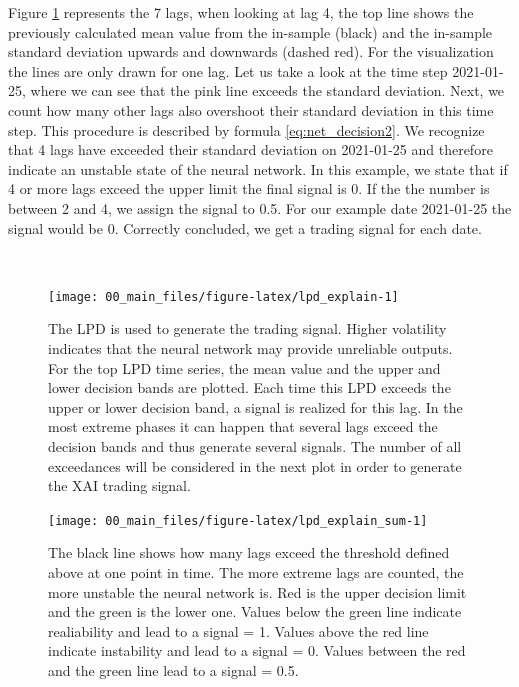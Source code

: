 \documentclass[
]{article}
\begin{document}
Figure \ref{fig:lpd_explain} represents the 7 lags, when looking at lag
4, the top line shows the previously calculated mean value from the
in-sample (black) and the in-sample standard deviation upwards and
downwards (dashed red). For the visualization the lines are only drawn
for one lag. Let us take a look at the time step 2021-01-25, where we
can see that the pink line exceeds the standard deviation. Next, we
count how many other lags also overshoot their standard deviation in
this time step. This procedure is described by formula
\ref{eq:net_decision2}. We recognize that 4 lags have exceeded their
standard deviation on 2021-01-25 and therefore indicate an unstable
state of the neural network. In this example, we state that if 4 or more
lags exceed the upper limit the final signal is 0. If the the number is
between 2 and 4, we assign the signal to 0.5. For our example date
2021-01-25 the signal would be 0. Correctly concluded, we get a trading
signal for each date.

~

\begin{figure}

{\centering \texttt{[image: 00\_main\_files/figure-latex/lpd\_explain-1]} 

}

\caption{The LPD is used to generate the trading signal. Higher volatility indicates that the neural network may provide unreliable outputs. For the top LPD time series, the mean value and the upper and lower decision bands are plotted. Each time this LPD exceeds the upper or lower decision band, a signal is realized for this lag. In the most extreme phases it can happen that several lags exceed the decision bands and thus generate several signals. The number of all exceedances will be considered in the next plot in order to generate the XAI trading signal.}\label{fig:lpd_explain}
\end{figure}

\newpage

\begin{figure}

{\centering \texttt{[image: 00\_main\_files/figure-latex/lpd\_explain\_sum-1]} 

}

\caption{The black line shows how many lags exceed the threshold defined above at one point in time. The more extreme lags are counted, the more unstable the neural network is. Red is the upper decision limit and the green is the lower one. Values below the green line indicate realiability and lead to a signal = 1. Values above the red line indicate instability and lead to a signal = 0. Values between the red and the green line lead to a signal = 0.5.}\label{fig:lpd_explain_sum}
\end{figure}
\end{document}
